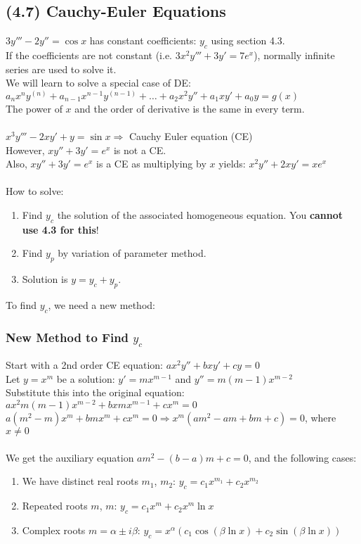 \documentclass{article}
\begin{document}
\subsection{(4.7) Cauchy-Euler Equations}
$3y'''-2y''=\cos x$ has constant coefficients: $y_c$ using section 4.3.
\\If the coefficients are not constant (i.e. $3x^2y'''+3y'=7e^x$), normally infinite series are used to solve it.
\\We will learn to solve a special case of DE: $a_nx^ny^{(n)}+a_{n-1}x^{n-1}y^{(n-1)}+\dots+a_2x^2y''+a_1xy'+a_0y=g(x)$
\\The power of $x$ and the order of derivative is the same in every term.
\\\\$x^3y'''-2xy'+y=\sin x\Rightarrow$ Cauchy Euler equation (CE)
\\However, $xy''+3y'=e^x$ is not a CE.
\\Also, $xy''+3y'=e^x$ is a CE as multiplying by $x$ yields: $x^2y''+2xy'=xe^x$
\\\\How to solve: \begin{enumerate}
    \itemsep 0em
    \item Find $y_c$ the solution of the associated homogeneous equation. You \textbf{cannot use 4.3 for this}!
    \item Find $y_p$ by variation of parameter method.
    \item Solution is $y=y_c+y_p$.
\end{enumerate}
To find $y_c$, we need a new method:

\subsubsection{New Method to Find $y_c$}
Start with a 2nd order CE equation: $ax^2y''+bxy'+cy=0$
\\Let $y=x^m$ be a solution: $y'=mx^{m-1}$ and $y''=m(m-1)x^{m-2}$
\\Substitute this into the original equation: $ax^2m(m-1)x^{m-2}+bxmx^{m-1}+cx^m=0$
\\$a(m^2-m)x^m+bmx^m+cx^m=0\Rightarrow x^m(am^2-am+bm+c)=0$, where $x\neq0$
\\\\We get the auxiliary equation $am^2-(b-a)m+c=0$, and the following cases: \begin{enumerate}
    \itemsep 0em
    \item We have distinct real roots $m_1$, $m_2$: $y_c=c_1x^{m_1}+c_2x^{m_2}$
    \item Repeated roots $m$, $m$: $y_c=c_1x^m+c_2x^m\ln x$
    \item Complex roots $m=\alpha\pm i\beta$: $y_c=x^{\alpha}(c_1\cos(\beta\ln x)+c_2\sin(\beta\ln x))$
\end{enumerate}
\end{document}
